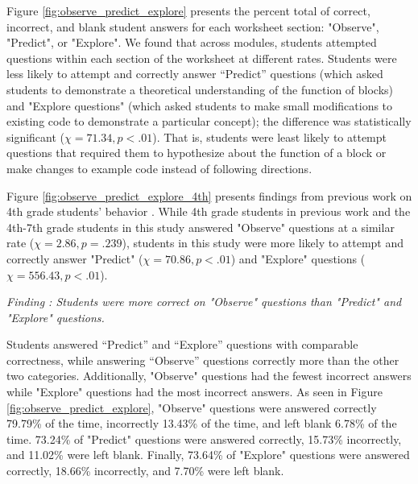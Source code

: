 {\begin{figure}
\end{figure}

Figure \ref{fig:observe_predict_explore} presents the percent total of correct, incorrect, and blank student answers for each worksheet section: "Observe", "Predict", or "Explore". We found that across modules, students attempted questions within each section of the worksheet at different rates. Students were less likely to attempt and correctly answer “Predict” questions (which asked students to demonstrate a theoretical understanding of the function of blocks) and "Explore questions" (which asked students to make small modifications to existing code to demonstrate a particular concept); the difference was statistically significant (\begin{math}\chi=71.34, p<.01\end{math}). That is, students were least likely to attempt questions that required them to hypothesize about the function of a block or make changes to example code instead of following directions.

Figure \ref{fig:observe_predict_explore_4th} presents findings from previous work on 4th grade students' \ts{} behavior \cite{franklin2020exploring}. While 4th grade students in previous work and the 4th-7th grade students in this study answered "Observe" questions at a similar rate (\begin{math}\chi=2.86, p=.239\end{math}), students in this study were more likely to attempt and correctly answer "Predict" (\begin{math}\chi=70.86, p<.01\end{math}) and "Explore" questions (\begin{math}\chi=556.43, p<.01\end{math}). 

\textit{Finding : Students were more correct on "Observe" questions than "Predict" and "Explore" questions.} 

Students answered “Predict” and “Explore” questions with comparable correctness, while answering “Observe” questions correctly more than the other two categories. Additionally, "Observe" questions had the fewest incorrect answers while "Explore" questions had the most incorrect answers. As seen in Figure \ref{fig:observe_predict_explore}, "Observe" questions were answered correctly 79.79\% of the time, incorrectly 13.43\% of the time, and left blank 6.78\% of the time. 73.24\% of "Predict" questions were answered correctly, 15.73\% incorrectly, and 11.02\% were left blank. Finally, 73.64\% of "Explore" questions were answered correctly, 18.66\% incorrectly, and 7.70\% were left blank.%

}
